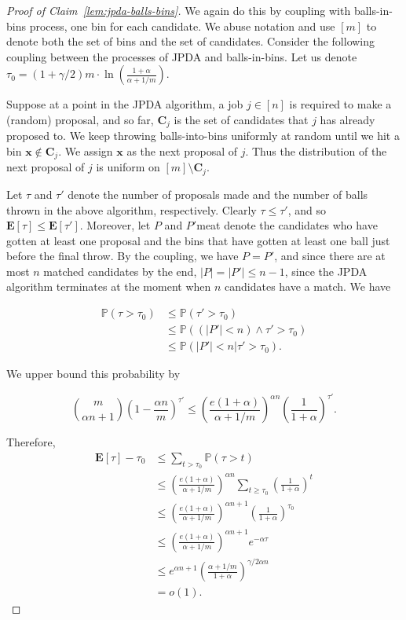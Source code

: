 \documentclass[11pt]{amsart}
\begin{document}
\begin{proof}[Proof of Claim~\ref{lem:jpda-balls-bins}]
We again do this by coupling with balls-in-bins process, one bin for each candidate. We abuse notation and use $[m]$ to denote both the set of bins and the set of candidates. Consider the following coupling between the processes of JPDA and balls-in-bins. Let us denote $\tau_0 = (1+\gamma/2)m \cdot \ln \left(\frac{1+\alpha}{\alpha + 1/m}\right)$.

Suppose at a point in the JPDA algorithm, a job $j \in [n]$ is required to make a (random) proposal, and so far, $\mathbf{C}_j$ is the set of candidates that $j$ has already proposed to. We keep throwing balls-into-bins uniformly at random until we hit a bin $\mathbf{x} \not\in \mathbf{C}_j$. We assign $\mathbf{x}$ as the next proposal of $j$. Thus the distribution of the next proposal of $j$ is uniform on $[m] \setminus \mathbf{C}_j$. 

Let $\tau$ and $\tau'$ denote the number of proposals made and the number of balls thrown in the above algorithm, respectively. Clearly $\tau \leq \tau'$, and so $\mathbf{E}[\tau] \leq \mathbf{E}[\tau']$. Moreover, let $P$ and $P'$meat denote the candidates who have gotten at least one proposal and the bins that have gotten at least one ball just before the final throw. By the coupling, we have $P = P'$, and since there are at most $n$ matched candidates by the end, $|P| = |P'| \leq n-1$, since the JPDA algorithm terminates at the moment when $n$ candidates have a match. We have

\begin{align*}
\mathbb{P}\left(\tau > \tau_0\right) & \leq \mathbb{P}\left(\tau' >  \tau_0\right) \\
& \leq \mathbb{P}\left((|P'| < n)\land \tau' > \tau_0 \right) \\
& \leq \mathbb{P}\left(|P'| < n | \tau' >\tau_0 \right).
\end{align*}

We upper bound this probability by 

\[
\binom{m}{\alpha n + 1}\left(1 - \frac{\alpha n}{m}\right)^{\tau'} \leq \left(\frac{e(1 + \alpha)}{\alpha + 1/m}\right)^{\alpha n}\left(\frac{1}{1+\alpha}\right)^{\tau'}.
\]

Therefore,
\begin{align*}
\mathbf{E}[\tau] - \tau_0 & \leq \sum_{t > \tau_0}\mathbb{P}\left(\tau > t\right) \\
&\leq \left(\frac{e(1 + \alpha)}{\alpha + 1/m}\right)^{\alpha n}\sum_{t \geq \tau_0}\left(\frac{1}{1+\alpha}\right)^{t} \\
& \leq \left(\frac{e(1 + \alpha)}{\alpha + 1/m}\right)^{\alpha n + 1}\left(\frac{1}{1+\alpha}\right)^{\tau_0} \\
& \leq \left(\frac{e(1 + \alpha)}{\alpha + 1/m}\right)^{\alpha n + 1}e^{-\alpha \tau} \\
& \leq e^{\alpha n + 1}\left(\frac{\alpha + 1/m}{1 + \alpha}\right)^{\gamma/2 \alpha n} \\
& = o(1).
\end{align*}


\end{proof}
 
\end{document}
